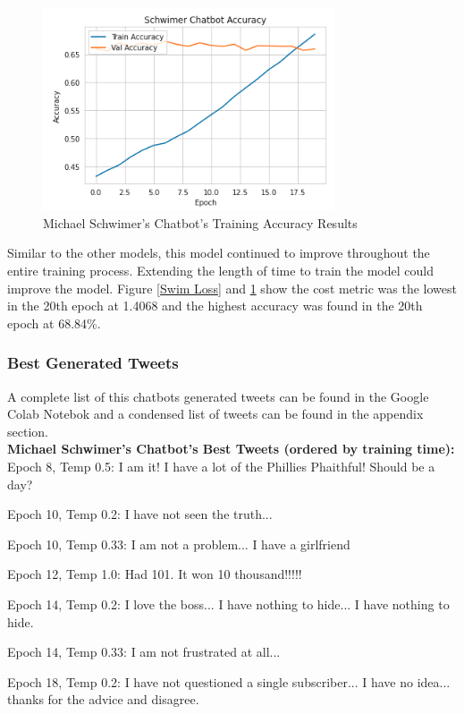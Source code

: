 \documentclass[5p,authoryear]{elsarticle}
\begin{document}
\begin{figure}[!htb] \centering
	\includegraphics[width=3.4in]{figures/Swim_Acc.png}
	\caption[]{Michael Schwimer’s Chatbot’s Training Accuracy Results} 
	\label{Swim Acc} 
\end{figure}


Similar to the other models, this model continued to improve throughout the entire training process. Extending the length of time to train the model could improve the model. Figure \ref{Swim Loss} and \ref{Swim Acc} show the cost metric was the lowest in the 20th epoch at 1.4068 and the highest accuracy was found in the 20th epoch at 68.84\%.


\subsubsection{Best Generated Tweets}

A complete list of this chatbots generated tweets can be found in the Google Colab Notebok and a condensed list of tweets can be found in the appendix section.\\

\textbf{Michael Schwimer’s  Chatbot’s Best Tweets (ordered by training time):}\\

Epoch 8, Temp 0.5:
I am it! I have a lot of the Phillies Phaithful! Should be a day? 

Epoch 10, Temp 0.2:
I have not seen the truth...

Epoch 10, Temp 0.33:
I am not a problem... I have a girlfriend 

Epoch 12, Temp 1.0:
Had 101. It won 10 thousand!!!!!

Epoch 14, Temp 0.2:
I love the boss... I have nothing to hide... I have nothing to hide. 

Epoch 14, Temp 0.33:
I am not frustrated at all... 

Epoch 18, Temp 0.2:
I have not questioned a single subscriber... I have no idea... thanks for the advice and disagree. 
\end{document}

